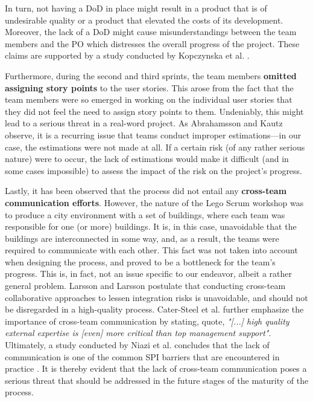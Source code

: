 \documentclass[conference]{IEEEtran}
\begin{document}
In turn, not having a DoD in place might result in a product that is of
undesirable quality or a product that elevated the costs of its development.
Moreover, the lack of a DoD might cause misunderstandings between the team
members and the PO which distresses the overall progress of the project. These
claims are supported by a study conducted by Kopczynska et al.
\cite{Kopczynska2022}.

Furthermore, during the second and third sprints, the team members \textbf{omitted
assigning story points} to the user stories. This arose from the fact that the
team members were so emerged in working on the individual user stories that
they did not feel the need to assign story points to them. Undeniably, this
might lead to a serious threat in a real-word project. As Abrahamsson and Kautz
\cite{Abrahamsson2002} observe, it is a recurring issue that teams conduct improper
estimations---in our case, the estimations were not made at all. If a certain
risk (of any rather serious nature) were to occur, the lack of estimations
would make it difficult (and in some cases impossible) to assess the impact of
the risk on the project's progress.

Lastly, it has been observed that the process did not entail any \textbf{cross-team
communication efforts}. However, the nature of the Lego Scrum workshop was to
produce a city environment with a set of buildings, where each team was
responsible for one (or more) buildings. It is, in this case, unavoidable that
the buildings are interconnected in some way, and, as a result, the teams were
required to communicate with each other. This fact was not taken
into account when designing the process, and proved to be a bottleneck for the
team's progress. This is, in fact, not an issue specific to our endeavor,
albeit a rather general problem. Larsson and Larsson \cite{Larsson2020}
postulate that conducting cross-team collaborative approaches to lessen
integration risks is unavoidable, and should not be disregarded in a
high-quality process. Cater-Steel et al. \cite{CaterSteel2006} further
emphasize the importance of cross-team communication by stating, quote,
\textit{"[...] high quality external expertise is [even] more critical than top
management support"}. Ultimately, a study conducted by Niazi et al. concludes
that the lack of communication is one of the common SPI barriers that are
encountered in practice \cite{Niazi2010}.
It is thereby evident that the lack of cross-team communication poses a serious
threat that should be addressed in the future stages of the maturity of the
process.
\end{document}

